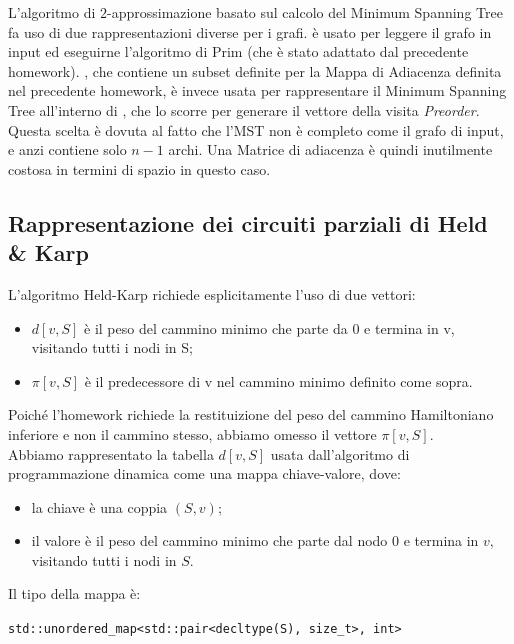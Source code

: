 \noindent L'algoritmo di $2$-approssimazione basato sul calcolo del Minimum Spanning Tree fa uso di due rappresentazioni diverse per i grafi.
 è usato per leggere il grafo in input ed eseguirne l'algoritmo di Prim (che è stato adattato dal precedente homework). , che contiene un subset definite per la Mappa di Adiacenza definita nel precedente homework, è invece usata per rappresentare il Minimum Spanning Tree all'interno di , che lo scorre per generare il vettore della visita \textit{Preorder}. Questa scelta è dovuta al fatto che l'MST non è completo come il grafo di input, e anzi contiene solo $n - 1$ archi. Una Matrice di adiacenza è quindi inutilmente costosa in termini di spazio in questo caso.

\newpage
\subsection{Rappresentazione dei circuiti parziali di Held \& Karp}

L'algoritmo Held-Karp richiede esplicitamente l'uso di due vettori:
\begin{itemize}
    \item $d[v,S]$ è il peso del cammino minimo che parte da 0 e termina in v, visitando tutti i nodi in S;
    \item $\pi[v,S]$ è il predecessore di v nel cammino minimo definito come sopra.
\end{itemize}

\noindent Poiché l'homework richiede la restituizione del peso del cammino Hamiltoniano inferiore e non il cammino stesso, abbiamo omesso il vettore $\pi[v,S]$. \\

Abbiamo rappresentato la tabella $d[v,S]$ usata dall'algoritmo di programmazione dinamica come una mappa chiave-valore, dove:

\begin{itemize}
    \item la chiave è una coppia $(S, v)$;
    \item il valore è il peso del cammino minimo che parte dal nodo 0 e termina in $v$, visitando tutti i nodi in $S$.
\end{itemize}

\noindent Il tipo della mappa è:

\begin{center}
    \texttt{std::unordered_map<std::pair<decltype(S), size_t>, int>}
\end{center}


